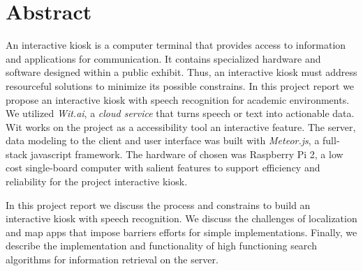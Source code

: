 %
\chapter*{Abstract}
\label{sec:abstract}
\vspace*{-10mm}


An interactive kiosk is a computer terminal that provides access to information and applications for communication.
It contains specialized hardware and software designed within a public exhibit.
Thus, an interactive kiosk must address resourceful solutions to minimize its possible constrains.
In this project report we propose an interactive kiosk with speech recognition for academic environments.
We utilized \emph{Wit.ai}, a \emph{cloud service} that turns speech or text into actionable data.
Wit works on the project as a accessibility tool an interactive feature.
The server, data modeling to the client and user interface was built with \emph{Meteor.js}, a full-stack javascript framework.
The hardware of chosen was Raspberry Pi 2, a low cost single-board computer with salient features to support efficiency and reliability for the project interactive kiosk.

In this project report we discuss the process and constrains to build an interactive kiosk with speech recognition.
We discuss the challenges of localization and map apps that impose barriers efforts for simple implementations.
Finally, we describe the implementation and functionality of high functioning search algorithms for information retrieval on the server.

